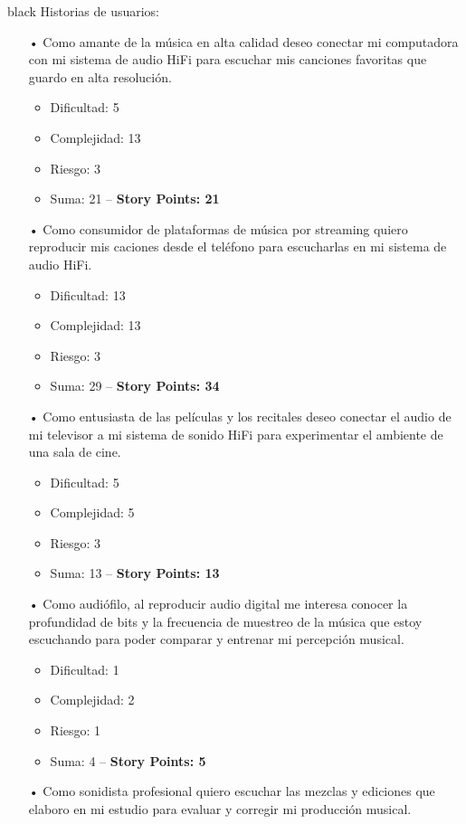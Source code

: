 \documentclass[
11pt, %
]{charter}
\begin{document}
\begin{consigna}{black}
Historias de usuarios:
\begin{itemize}
	\item[•] Como amante de la música en alta calidad deseo conectar mi computadora con mi sistema de audio HiFi para escuchar mis canciones favoritas que guardo en alta resolución. 
	\begin{itemize}
	\item Dificultad: 5
	\item Complejidad: 13
	\item Riesgo: 3
	\item Suma: 21 -- \textbf{Story Points: 21}
	\end{itemize}
	\item[•] Como consumidor de plataformas de música por streaming quiero reproducir mis caciones desde el teléfono para escucharlas en mi sistema de audio HiFi.
	\begin{itemize}
	\item Dificultad: 13
	\item Complejidad: 13
	\item Riesgo: 3
	\item Suma: 29 -- \textbf{Story Points: 34}
	\end{itemize}
	\item[•] Como entusiasta de las películas y los recitales deseo conectar el audio de mi televisor a mi sistema de sonido HiFi para experimentar el ambiente de una sala de cine.
	\begin{itemize}
	\item Dificultad: 5
	\item Complejidad: 5
	\item Riesgo: 3
	\item Suma: 13 -- \textbf{Story Points: 13}
	\end{itemize}
	\item[•] Como audiófilo, al reproducir audio digital me interesa conocer la profundidad de bits y la frecuencia de muestreo de la música que estoy escuchando para poder comparar y entrenar mi percepción musical.
	\begin{itemize}
	\item Dificultad: 1
	\item Complejidad: 2
	\item Riesgo: 1
	\item Suma: 4 -- \textbf{Story Points: 5}
	\end{itemize}
	\item[•] Como sonidista profesional quiero escuchar las mezclas y ediciones que elaboro en mi estudio para evaluar y corregir mi producción musical.

\end{itemize}
\end{consigna}
\end{document}
